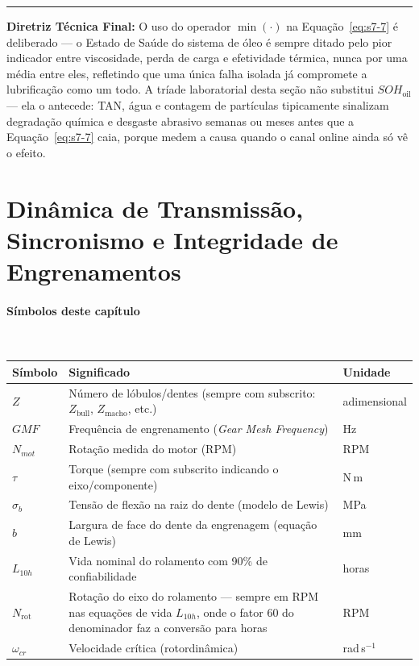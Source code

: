 \documentclass[12pt,a4paper]{article}
\numberwithin{equation}{section}
\numberwithin{table}{section}
\numberwithin{figure}{section}
\begin{document}
	\vspace{1em}
	\hrule
	\vspace{1em}

	\textbf{Diretriz Técnica Final:} O uso do operador $\min(\cdot)$ na Equação~\eqref{eq:s7-7} é deliberado — o Estado de Saúde do sistema de óleo é sempre ditado pelo pior indicador entre viscosidade, perda de carga e efetividade térmica, nunca por uma média entre eles, refletindo que uma única falha isolada já compromete a lubrificação como um todo. A tríade laboratorial desta seção não substitui $SOH_{\text{oil}}$ — ela o antecede: TAN, água e contagem de partículas tipicamente sinalizam degradação química e desgaste abrasivo semanas ou meses antes que a Equação~\eqref{eq:s7-7} caia, porque medem a causa quando o canal online ainda só vê o efeito.

	
	
	\clearpage
	\section{\textbf{Dinâmica de Transmissão, Sincronismo e Integridade de Engrenamentos}}

\paragraph{Símbolos deste capítulo}\mbox{}\\[-0.5em]
{\small
\begin{longtable}{>{\raggedright\arraybackslash}p{2.6cm} >{\raggedright\arraybackslash}p{9.2cm} >{\raggedright\arraybackslash}p{2.6cm}}
	\toprule
	\textbf{Símbolo} & \textbf{Significado} & \textbf{Unidade} \\ \midrule
	\endhead
	$Z$ & Número de lóbulos/dentes (sempre com subscrito: $Z_{\text{bull}}$, $Z_{\text{macho}}$, etc.) & adimensional \\
	$GMF$ & Frequência de engrenamento (\textit{Gear Mesh Frequency}) & Hz \\
	$N_{mot}$\dag & Rotação medida do motor (RPM) & RPM \\
	$\tau$ & Torque (sempre com subscrito indicando o eixo/componente) & N\,m \\
	$\sigma_b$ & Tensão de flexão na raiz do dente (modelo de Lewis) & MPa \\
	$b$ & Largura de face do dente da engrenagem (equação de Lewis) & mm \\
	$L_{10h}$ & Vida nominal do rolamento com 90\% de confiabilidade & horas \\
	$N_{\text{rot}}$\dag & Rotação do eixo do rolamento — sempre em RPM nas equações de vida $L_{10h}$, onde o fator 60 do denominador faz a conversão para horas & RPM \\
	$\omega_{cr}$ & Velocidade crítica (rotordinâmica) & rad\,s$^{-1}$ \\
	\bottomrule
\end{longtable}
}
\end{document}
